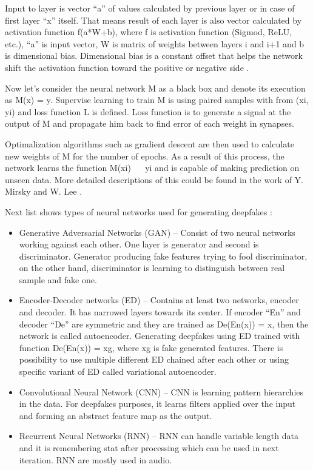 Input to layer is vector “a” of values calculated by previous layer or in case of first layer “x” itself. That means result of each layer is also vector calculated by activation function f(a*W+b), where f is activation function (Sigmod, ReLU, etc.), “a” is input vector, W is matrix of weights between layers i and i+1 and b is dimensional bias. Dimensional bias is a constant offset that helps the network shift the activation function toward the positive or negative side \cite{NeuralNetworkBias}.

Now let’s consider the neural network M as a black box and denote its execution as M(x) = y. Supervise learning to train M is using paired samples with from (xi, yi) and loss function L is defined. Loss function is to generate a signal at the output of M and propagate him back to find error of each weight in synapses.

Optimalization algorithms such as gradient descent are then used to calculate new weights of M for the number of epochs. As a result of this process, the network learns the function M(xi) ~~ yi and is capable of making prediction on unseen data. More detailed descriptions of this could be found in the work of Y. Mirsky and W. Lee \cite{CreationandDetectionofDeepfakes}.

Next list shows types of neural networks used for generating deepfakes \cite{CreationandDetectionofDeepfakes}:

\begin{itemize}
\item Generative Adversarial Networks (GAN) – Consist of two neural networks working against each other. One layer is generator and second is discriminator. Generator producing fake features trying to fool discriminator, on the other hand, discriminator is learning to distinguish between real sample and fake one.
\item Encoder-Decoder networks (ED) – Contains at least two networks, encoder and decoder. It has narrowed layers towards its center. If encoder “En” and decoder “De” are symmetric and they are trained as De(En(x)) = x, then the network is called autoencoder. Generating deepfakes using ED trained with function De(En(x)) = xg, where xg is fake generated features. There is possibility to use multiple different ED chained after each other or using specific variant of ED called variational autoencoder.
\item Convolutional Neural Network (CNN) – CNN is learning pattern hierarchies in the data. For deepfakes purposes, it learns filters applied over the input and forming an abstract feature map as the output.
\item Recurrent Neural Networks (RNN) – RNN can handle variable length data and it is remembering stat after processing which can be used in next iteration. RNN are mostly used in audio.
\end{itemize}

